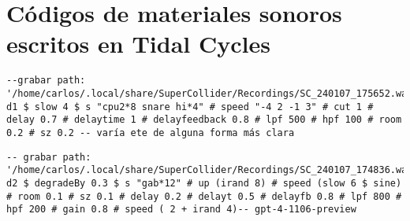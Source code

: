 \section*{Códigos de materiales sonoros escritos en Tidal Cycles}



\begin{minipage}[t]{1\textwidth}
    \centering
    \begin{lstlisting}[style=SuperCollider-IDE, language=ExtendedHaskell, basicstyle=\footnotesize\ttfamily, numbers=none]
--grabar path: '/home/carlos/.local/share/SuperCollider/Recordings/SC_240107_175652.wav'
d1 $ slow 4 $ s "cpu2*8 snare hi*4" # speed "-4 2 -1 3" # cut 1 # delay 0.7 # delaytime 1 # delayfeedback 0.8 # lpf 500 # hpf 100 # room 0.2 # sz 0.2 -- varía ete de alguna forma más clara                                        
    \end{lstlisting}
    \vspace{1cm}
\end{minipage}





\begin{minipage}[t]{1\textwidth}
    \centering
    \begin{lstlisting}[style=SuperCollider-IDE, language=ExtendedHaskell, basicstyle=\footnotesize\ttfamily, numbers=none]
-- grabar path: '/home/carlos/.local/share/SuperCollider/Recordings/SC_240107_174836.wav'
d2 $ degradeBy 0.3 $ s "gab*12" # up (irand 8) # speed (slow 6 $ sine) # room 0.1 # sz 0.1 # delay 0.2 # delayt 0.5 # delayfb 0.8 # lpf 800 # hpf 200 # gain 0.8 # speed ( 2 + irand 4)-- gpt-4-1106-preview                                   
    \end{lstlisting}
    \vspace{1cm}
\end{minipage}








